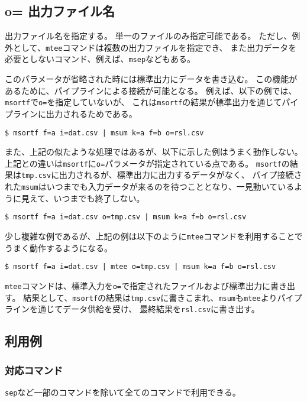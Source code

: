 
%

\subsection{o= 出力ファイル名\label{sect:option_o}}
出力ファイル名を指定する。
単一のファイルのみ指定可能である。
ただし、例外として、\verb|mtee|コマンドは複数の出力ファイルを指定でき、
また出力データを必要としないコマンド、例えば、\verb|msep|などもある。

このパラメータが省略された時には標準出力にデータを書き込む。
この機能があるために、パイプラインによる接続が可能となる。
例えば、以下の例では、\verb|msortf|で\verb|o=|を指定していないが、
これは\verb|msortf|の結果が標準出力を通じてパイプラインに出力されるためである。

\begin{Verbatim}[baselinestretch=0.7,frame=single]
$ msortf f=a i=dat.csv | msum k=a f=b o=rsl.csv
\end{Verbatim}

また、上記の似たような処理ではあるが、以下に示した例はうまく動作しない。
上記との違いは\verb|msortf|に\verb|o=|パラメータが指定されている点である。
\verb|msortf|の結果は\verb|tmp.csv|に出力されるが、標準出力に出力するデータがなく、
パイプ接続された\verb|msum|はいつまでも入力データが来るのを待つこととなり、一見動いているように見えて、いつまでも終了しない。

\begin{Verbatim}[baselinestretch=0.7,frame=single]
$ msortf f=a i=dat.csv o=tmp.csv | msum k=a f=b o=rsl.csv
\end{Verbatim}

少し複雑な例であるが、上記の例は以下のように\verb|mtee|コマンドを利用することでうまく動作するようになる。

\begin{Verbatim}[baselinestretch=0.7,frame=single]
$ msortf f=a i=dat.csv | mtee o=tmp.csv | msum k=a f=b o=rsl.csv
\end{Verbatim}

\verb|mtee|コマンドは、標準入力を\verb|o=|で指定されたファイルおよび標準出力に書き出す。
結果として、\verb|msortf|の結果は\verb|tmp.csv|に書きこまれ、\verb|msum|も\verb|mtee|よりパイプラインを通じてデータ供給を受け、
最終結果を\verb|rsl.csv|に書き出す。


\subsection*{利用例}


\subsubsection*{対応コマンド}
\verb|sep|など一部のコマンドを除いて全てのコマンドで利用できる。

%

